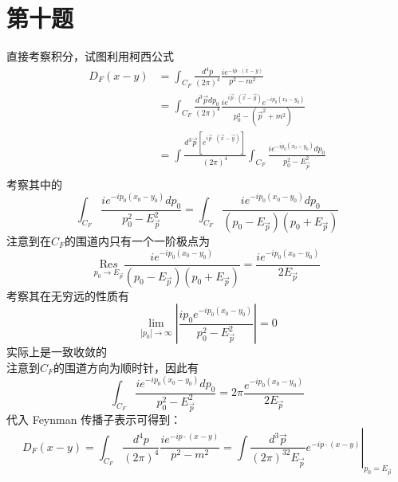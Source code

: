 \documentclass[a4paper]{ctexart}
\begin{document}
\section{第十题}
直接考察积分，试图利用柯西公式
$$
    \begin{aligned}
        D_F\left( x-y \right) & =\int_{C_F}{\frac{d^4p}{\left( 2\pi \right) ^4}\frac{ie^{-ip\cdot \left( x-y \right)}}{p^2-m^2}}                                                                                                  \\
                              & =\int_{C_F}{\frac{d^3\vec{p}dp_0}{\left( 2\pi \right) ^4}\frac{ie^{i\vec{p}\cdot \left( \vec{x}-\vec{y} \right)}e^{-ip_0\left( x_0-y_0 \right)}}{p_{0}^{2}-\left( \vec{p}^2+m^2 \right)}}         \\
                              & =\int{\frac{d^3\vec{p}\left[ e^{i\vec{p}\cdot \left( \vec{x}-\vec{y} \right)} \right]}{\left( 2\pi \right) ^4}}\int_{C_F}{\frac{ie^{-ip_0\left( x_0-y_0 \right)}dp_0}{p_{0}^{2}-E_{\vec{p}}^{2}}} \\
    \end{aligned}
$$
考察其中的
$$
    \int_{C_F}{\frac{ie^{-ip_0\left( x_0-y_0 \right)}dp_0}{p_{0}^{2}-E_{\vec{p}}^{2}}}=\int_{C_F}{\frac{ie^{-ip_0\left( x_0-y_0 \right)}dp_0}{\left( p_0-E_{\vec{p}} \right) \left( p_0+E_{\vec{p}} \right)}}
$$
注意到在$C_F$的围道内只有一个一阶极点为
$$
    \underset{p_0\rightarrow E_{\vec{p}}}{\text{Re}s}\frac{ie^{-ip_0\left( x_0-y_0 \right)}}{\left( p_0-E_{\vec{p}} \right) \left( p_0+E_{\vec{p}} \right)}=\frac{ie^{-ip_0\left( x_0-y_0 \right)}}{2E_{\vec{p}}}
$$
考察其在无穷远的性质有
$$
    \underset{|p_0|\rightarrow \infty}{\lim}\left| \frac{ip_0e^{-ip_0\left( x_0-y_0 \right)}}{p_{0}^{2}-E_{\vec{p}}^{2}} \right|=0
$$
实际上是一致收敛的\\
注意到$C_F$的围道方向为顺时针，因此有
$$
    \int_{C_F}{\frac{ie^{-ip_0\left( x_0-y_0 \right)}dp_0}{p_{0}^{2}-E_{\vec{p}}^{2}}}=2\pi \frac{e^{-ip_0\left( x_0-y_0 \right)}}{2E_{\vec{p}}}
$$
代入 Feynman 传播子表示可得到：
$$
    D_F\left( x-y \right) =\int_{C_F}{\frac{d^4p}{\left( 2\pi \right) ^4}\frac{ie^{-ip\cdot \left( x-y \right)}}{p^2-m^2}}=\left. \int{\frac{d^3\vec{p}}{\left( 2\pi \right) ^32E_{\vec{p}}}e^{-ip\cdot \left( x-y \right)}} \right|_{p_0=E_{\vec{p}}}
$$
\end{document}
